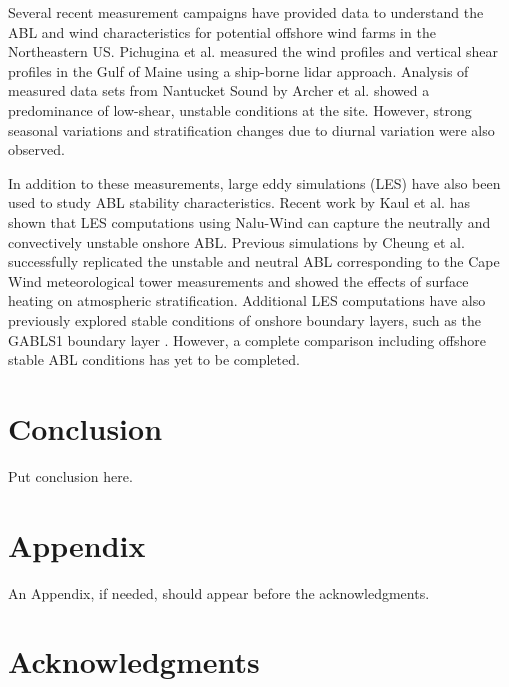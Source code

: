 \documentclass[conf]{new-aiaa}
\begin{document}
Several recent measurement campaigns have provided data to understand
the ABL and wind characteristics for potential offshore wind farms in
the Northeastern US.  Pichugina et al. \cite{pichugina2017properties}
measured the wind profiles and vertical shear profiles in the Gulf of
Maine using a ship-borne lidar approach.  Analysis of measured data
sets from Nantucket Sound by Archer et
al. \cite{archer2016predominance} showed a predominance of low-shear,
unstable conditions at the site.  However, strong seasonal variations
and stratification changes due to diurnal variation were also
observed.

In addition to these measurements, large eddy simulations (LES) have
also been used to study ABL stability characteristics.  Recent work by
Kaul et al. \cite{kaul2020large} has shown that LES computations using
Nalu-Wind can capture the neutrally and convectively unstable onshore
ABL.  Previous simulations by Cheung et al. \cite{cheung2020large}
successfully replicated the unstable and neutral ABL corresponding to
the Cape Wind meteorological tower measurements
\cite{archer2016predominance} and showed the effects of surface
heating on atmospheric stratification.  Additional LES computations
\cite{sullivan2016turbulent} have also previously explored stable
conditions of onshore boundary layers, such as the GABLS1 boundary
layer \cite{beare2006intercomparison}.  However, a complete comparison
including offshore stable ABL conditions has yet to be completed.






\section{Conclusion}
Put conclusion here.

\section*{Appendix}

An Appendix, if needed, should appear before the acknowledgments.

\section*{Acknowledgments}
\end{document}
